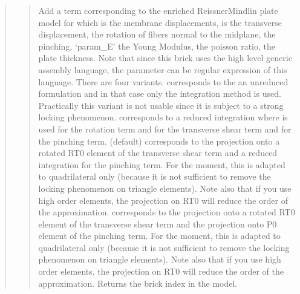 \documentclass[a4paper,11pt,english]{sphinxmanual}
\begin{document}
\begin{quote}
\begin{quote}

Add a term corresponding to the enriched Reissner\sphinxhyphen{}Mindlin plate
model for which  is the membrane displacements,
 is the transverse displacement,
 the rotation of
fibers normal to the midplane,
 the pinching,
‘param\_E’ the Young Modulus,
 the poisson ratio,
 the plate thickness. Note that since this brick
uses the high level generic assembly language, the parameter can
be regular expression of this language.
There are four variants.
 corresponds to the an
unreduced formulation and in that case only the integration
method  is used. Practically this variant is not usable since
it is subject to a strong locking phenomenon.
 corresponds to a reduced integration where  is
used for the rotation term and  for the transverse
shear term and  for the pinching term.
 (default) corresponds to the projection onto
a rotated RT0 element of the transverse shear term and a reduced integration for the pinching term.
For the moment, this is adapted to quadrilateral only (because it is not sufficient to
remove the locking phenomenon on triangle elements). Note also that if
you use high order elements, the projection on RT0 will reduce the order
of the approximation.
 corresponds to the projection onto
a rotated RT0 element of the transverse shear term and the projection onto P0 element of the pinching term.
For the moment, this is adapted to quadrilateral only (because it is not sufficient to
remove the locking phenomenon on triangle elements). Note also that if
you use high order elements, the projection on RT0 will reduce the order
of the approximation.
Returns the brick index in the model.
\end{quote}

\begin{quote}


\end{quote}
\end{quote}
\end{document}
